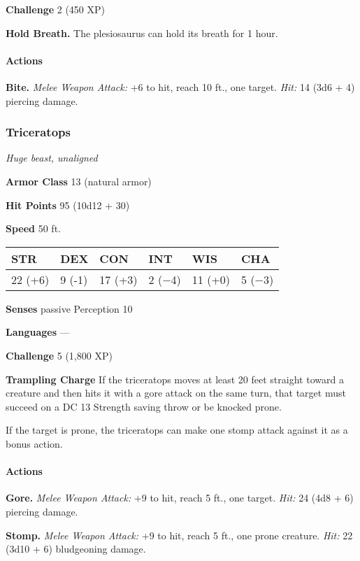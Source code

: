 \documentclass[
]{article}
\begin{document}
\textbf{Challenge} 2 (450 XP)

\textbf{Hold Breath.} The plesiosaurus can hold its breath for 1 hour.

\hypertarget{actions-19}{%
\paragraph{Actions}\label{actions-19}}

\textbf{Bite.} \emph{Melee Weapon Attack:} +6 to hit, reach 10 ft., one
target. \emph{Hit:} 14 (3d6 + 4) piercing damage.

\hypertarget{triceratops}{%
\subsubsection{Triceratops}\label{triceratops}}

\emph{Huge beast, unaligned}

\textbf{Armor Class} 13 (natural armor)

\textbf{Hit Points} 95 (10d12 + 30)

\textbf{Speed} 50 ft.

\begin{longtable}[]{@{}llllll@{}}
\toprule
STR & DEX & CON & INT & WIS & CHA\tabularnewline
\midrule
\endhead
22 (+6) & 9 (-1) & 17 (+3) & 2 (−4) & 11 (+0) & 5 (−3)\tabularnewline
\bottomrule
\end{longtable}

\textbf{Senses} passive Perception 10

\textbf{Languages} ---

\textbf{Challenge} 5 (1,800 XP)

\textbf{Trampling Charge} If the triceratops moves at least 20 feet
straight toward a creature and then hits it with a gore attack on the
same turn, that target must succeed on a DC 13 Strength saving throw or
be knocked prone.

If the target is prone, the triceratops can make one stomp attack
against it as a bonus action.

\hypertarget{actions-20}{%
\paragraph{Actions}\label{actions-20}}

\textbf{Gore.} \emph{Melee Weapon Attack:} +9 to hit, reach 5 ft., one
target. \emph{Hit:} 24 (4d8 + 6) piercing damage.

\textbf{Stomp.} \emph{Melee Weapon Attack:} +9 to hit, reach 5 ft., one
prone creature. \emph{Hit:} 22 (3d10 + 6) bludgeoning damage.
\end{document}

